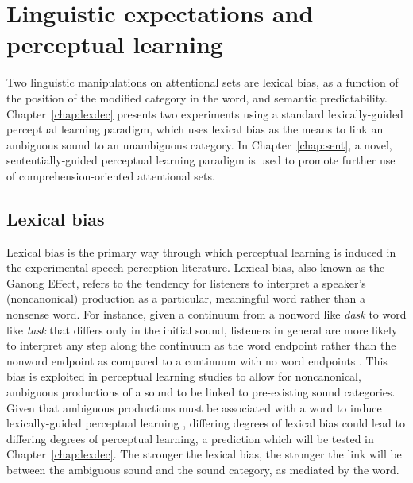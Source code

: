 \section{Linguistic expectations and perceptual learning}
\label{sec:linguistic}

Two linguistic manipulations on attentional sets are lexical bias, as a function of the position of the modified category in the word, and semantic predictability.
Chapter~\ref{chap:lexdec} presents two experiments using a standard lexically-guided perceptual learning paradigm, which uses lexical bias as the means to link an ambiguous sound to an unambiguous category.
In Chapter~\ref{chap:sent}, a novel, sententially-guided perceptual learning paradigm is used to promote further use of comprehension-oriented attentional sets.

\subsection{Lexical bias}
\label{sec:lexicalbias}

Lexical bias is the primary way through which perceptual learning is induced in the experimental speech perception literature.
Lexical bias, also known as the Ganong Effect, refers to the tendency for listeners to interpret a speaker's (noncanonical) production as a particular, meaningful word rather than a nonsense word.  
For instance, given a continuum from a nonword like \emph{dask} to word like \emph{task} that differs only in the initial sound, listeners in general are more likely to interpret any step along the continuum as the word endpoint rather than the nonword endpoint as compared to a continuum with no word endpoints \citep{Ganong1980}. 
This bias is exploited in perceptual learning studies to allow for noncanonical, ambiguous productions of a sound to be linked to pre-existing sound categories.
Given that ambiguous productions must be associated with a word to induce lexically-guided perceptual learning \citep{Norris2003}, differing degrees of lexical bias could lead to differing degrees of perceptual learning, a prediction which will be tested in Chapter~\ref{chap:lexdec}.  
The stronger the lexical bias, the stronger the link will be between the ambiguous sound and the sound category, as mediated by the word.

